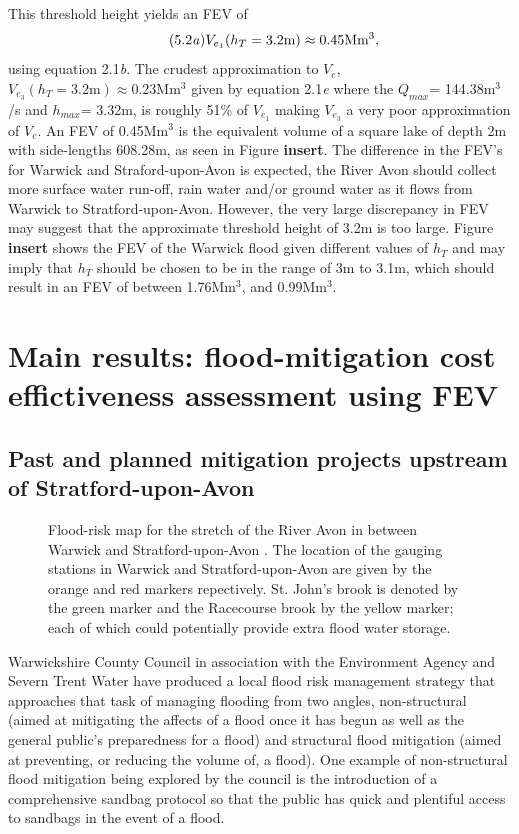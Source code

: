 \documentclass[11pt,a4paper]{article}
\begin{document}
This threshold height yields an FEV of
\begin{equation}\tag{5.2\textit{a}}
V_{e_1}(h_T=\text{3.2m})\approx 0.45\text{Mm$^3$},
\end{equation}
using equation 2.1\textit{b}. The crudest approximation to $V_e$, $V_{e_3}(h_T=\text{3.2m})\approx 0.23\text{Mm$^3$}$ given by equation 2.1\textit{e} where the $Q_{max}$= 144.38m$^3$/s and $h_{max}$= 3.32m, is roughly 51\% of $V_{e_1}$ making $V_{e_3}$ a very poor approximation of $V_e$. An FEV of 0.45Mm$^3$ is the equivalent volume of a square lake of depth 2m with side-lengths 608.28m, as seen in Figure \textbf{insert}. The difference in the FEV's for Warwick and Straford-upon-Avon is expected, the River Avon should collect more surface water run-off, rain water and/or ground water as it flows from Warwick to Stratford-upon-Avon. However, the very large discrepancy in FEV may suggest that the approximate threshold height of 3.2m is too large. Figure \textbf{insert} shows the FEV of the Warwick flood given different values of $h_T$ and may imply that $h_T$ should be chosen to be in the range of 3m to 3.1m, which should result in an FEV of between 1.76Mm$^3$, and 0.99Mm$^3$.

\section{Main results: flood-mitigation cost effictiveness assessment using FEV}
\subsection{Past and planned mitigation projects upstream of Stratford-upon-Avon}
\begin{figure}[ht!]
\begin{center}
\caption{Flood-risk map for the stretch of the River Avon in between Warwick and Stratford-upon-Avon \cite{flood-risk}. The location of the gauging stations in Warwick and Stratford-upon-Avon are given by the orange and red markers repectively. St. John's brook is denoted by the green marker and the Racecourse brook by the yellow marker{;} each of which could potentially provide extra flood water storage.}
\end{center}
\end{figure}

Warwickshire County Council in association with the Environment Agency and Severn Trent Water have produced a local flood risk management strategy \cite{war1} that approaches that task of managing flooding from two angles, non-structural (aimed at mitigating the affects of a flood once it has begun as well as the general public's preparedness for a flood) and structural flood mitigation (aimed at preventing, or reducing the volume of, a flood). One example of non-structural flood mitigation being explored by the council is the introduction of a comprehensive sandbag protocol so that the public has quick and plentiful access to sandbags in the event of a flood. 
\end{document}
